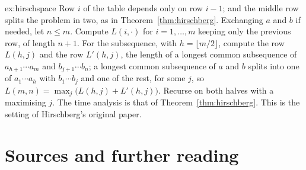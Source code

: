 \begin{solution}{ex:hirschspace}
\idea Row $i$ of the table depends only on row $i-1$; and the middle row splits the problem in two, as in Theorem~\ref{thm:hirschberg}.
\writeup Exchanging $a$ and $b$ if needed, let $n\le m$. Compute $L(i,\cdot)$ for $i=1,\dots,m$ keeping only the previous row, of length $n+1$. For the subsequence, with $h=\lfloor m/2\rfloor$, compute the row $L(h,j)$ and the row $L'(h,j)$, the length of a longest common subsequence of
$a_{h+1}\cdots a_m$ and $b_{j+1}\cdots b_n$; a longest common subsequence of $a$ and $b$ splits into one of $a_1\cdots a_h$ with $b_1\cdots b_j$ and one of the rest, for some $j$, so $L(m,n)=\max_j\big(L(h,j)+L'(h,j)\big)$. Recurse on both halves with a maximising $j$. The time analysis is that of
Theorem~\ref{thm:hirschberg}. This is the setting of Hirschberg's original paper.
\end{solution}

\section*{Sources and further reading}

